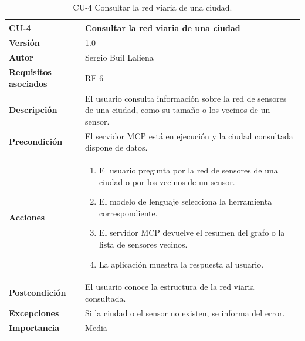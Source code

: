 \begin{table}[p]
	\centering
	\begin{tabularx}{\linewidth}{ p{} p{} }
		\toprule
		\textbf{CU-4}    & \textbf{Consultar la red viaria de una ciudad}\\
		\toprule
		\textbf{Versión}              & 1.0    \\
		\textbf{Autor}                & Sergio Buil Laliena \\
		\textbf{Requisitos asociados} & RF-6 \\
		\textbf{Descripción}          & El usuario consulta información sobre la red de sensores de una ciudad, como su tamaño o los vecinos de un sensor. \\
		\textbf{Precondición}         & El servidor MCP está en ejecución y la ciudad consultada dispone de datos. \\
		\textbf{Acciones}             &
		\begin{enumerate}
			\def\labelenumi{\arabic{enumi}.}
			\tightlist
			\item El usuario pregunta por la red de sensores de una ciudad o por los vecinos de un sensor.
			\item El modelo de lenguaje selecciona la herramienta correspondiente.
			\item El servidor MCP devuelve el resumen del grafo o la lista de sensores vecinos.
			\item La aplicación muestra la respuesta al usuario.
		\end{enumerate}\\
		\textbf{Postcondición}        & El usuario conoce la estructura de la red viaria consultada. \\
		\textbf{Excepciones}          & Si la ciudad o el sensor no existen, se informa del error. \\
		\textbf{Importancia}          & Media \\
		\bottomrule
	\end{tabularx}
	\caption{CU-4 Consultar la red viaria de una ciudad.}
	\label{tabla:cu4}
\end{table}


